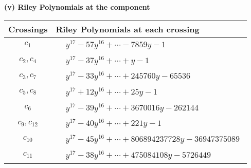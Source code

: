 \documentclass[1p]{elsarticle_modified}
\theoremstyle{definition}
\begin{document}
\newpage\renewcommand{\arraystretch}{1}
\flushleft \textbf{(v) Riley Polynomials at the component}\newline \\
\begin{tabular}{m{50pt}|m{274pt}}
Crossings & \hspace{64pt}Riley Polynomials at each crossing \\
\hline $$\begin{aligned}c_{1}\end{aligned}$$&$\begin{aligned}
&y^{17}-57 y^{16}+\cdots-7859 y-1
\end{aligned}$\\
\hline $$\begin{aligned}c_{2},c_{4}\end{aligned}$$&$\begin{aligned}
&y^{17}-37 y^{16}+\cdots+y-1
\end{aligned}$\\
\hline $$\begin{aligned}c_{3},c_{7}\end{aligned}$$&$\begin{aligned}
&y^{17}-33 y^{16}+\cdots+245760 y-65536
\end{aligned}$\\
\hline $$\begin{aligned}c_{5},c_{8}\end{aligned}$$&$\begin{aligned}
&y^{17}+12 y^{16}+\cdots+25 y-1
\end{aligned}$\\
\hline $$\begin{aligned}c_{6}\end{aligned}$$&$\begin{aligned}
&y^{17}-39 y^{16}+\cdots+3670016 y-262144
\end{aligned}$\\
\hline $$\begin{aligned}c_{9},c_{12}\end{aligned}$$&$\begin{aligned}
&y^{17}-40 y^{16}+\cdots+221 y-1
\end{aligned}$\\
\hline $$\begin{aligned}c_{10}\end{aligned}$$&$\begin{aligned}
&y^{17}-45 y^{16}+\cdots+806894237728 y-36947375089
\end{aligned}$\\
\hline $$\begin{aligned}c_{11}\end{aligned}$$&$\begin{aligned}
&y^{17}-38 y^{16}+\cdots+475084108 y-5726449
\end{aligned}$\\
\hline
\end{tabular}\\~\\
\end{document}
